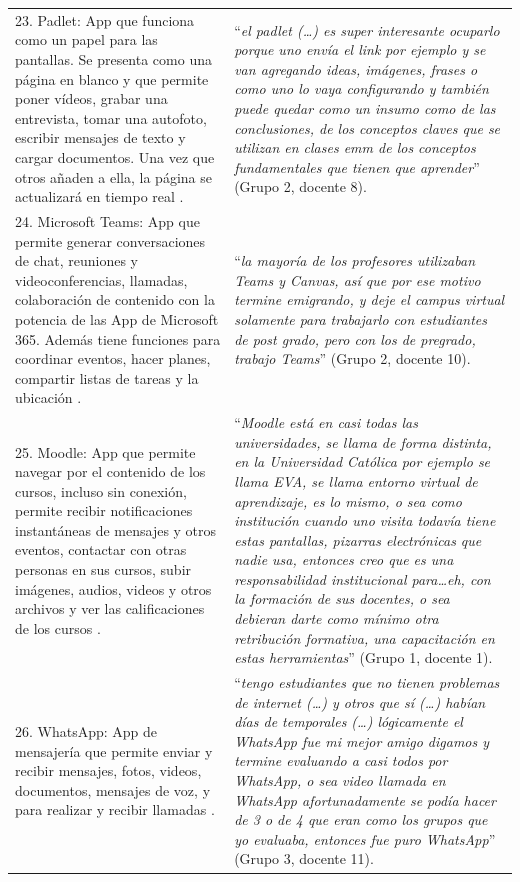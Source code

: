 \documentclass[spanish]{textolivre}
\begin{document}
\begin{longtable}{p{}p{}}
\\
23. Padlet: App que funciona como un papel para las pantallas. Se presenta como una página en blanco y que permite poner vídeos, grabar una entrevista, tomar una autofoto, escribir mensajes de texto y cargar documentos. Una vez que otros añaden a ella, la página se actualizará en tiempo real \cite{wallwisher_inc._padlet_2021}. &
“\emph{el padlet  (…) es super interesante ocuparlo porque uno envía el link por ejemplo y se van agregando ideas, imágenes, frases o como uno lo vaya configurando y también puede quedar como un insumo como de las conclusiones, de los conceptos claves que se utilizan en clases emm de los conceptos fundamentales que tienen que aprender}” (Grupo 2, docente 8).
\\
24.  Microsoft Teams: App que permite generar conversaciones de chat, reuniones y videoconferencias, llamadas, colaboración de contenido con la potencia de las App de Microsoft 365. Además tiene funciones para coordinar eventos, hacer planes, compartir listas de tareas y la ubicación \cite{microsoft2021b}. &
“\emph{la mayoría de los profesores utilizaban Teams y Canvas, así que por ese motivo termine emigrando, y deje el campus virtual solamente para trabajarlo con estudiantes de post grado, pero con los de pregrado, trabajo Teams}” (Grupo 2, docente 10).
\\
25. Moodle: App que permite navegar por el contenido de los cursos, incluso sin conexión, permite recibir notificaciones instantáneas de mensajes y otros eventos, contactar con otras personas en sus cursos, subir imágenes, audios, videos y otros archivos y ver las calificaciones de los cursos \cite{moodle_pty_ltd_moodle_nodate}. &
“\emph{Moodle está en casi todas las universidades, se llama de forma distinta, en la Universidad Católica por ejemplo se llama EVA, se llama entorno virtual de aprendizaje, es lo mismo, o sea como institución cuando uno visita todavía tiene estas pantallas, pizarras electrónicas que nadie usa, entonces creo que es una responsabilidad institucional para…eh, con la formación de sus docentes, o sea debieran darte como mínimo otra retribución formativa, una capacitación en estas herramientas}” (Grupo 1, docente 1).
\\
26. WhatsApp: App de mensajería que permite enviar y recibir mensajes, fotos, videos, documentos, mensajes de voz, y para realizar y recibir llamadas \cite{whatsapp2021a}. &
“\emph{tengo estudiantes que no tienen problemas de internet (…) y otros que sí (…) habían días de temporales (…) lógicamente el WhatsApp fue mi mejor amigo digamos y termine evaluando a casi todos por WhatsApp, o sea video llamada en WhatsApp afortunadamente se podía hacer de 3 o de 4 que eran como los grupos que yo evaluaba, entonces fue puro WhatsApp}” (Grupo 3, docente 11).

\end{longtable}
\end{document}
